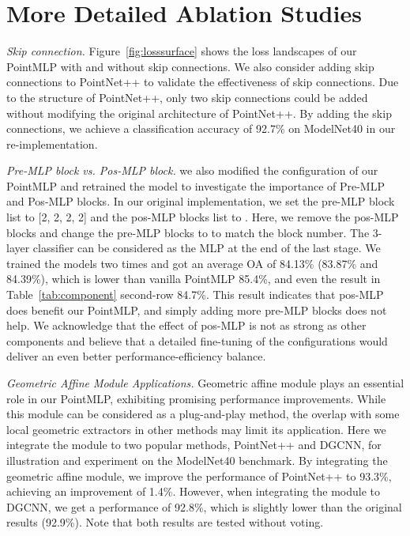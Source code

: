 \documentclass{article} \usepackage{iclr2022_conference,times}
\begin{document}
\section{More Detailed Ablation Studies}
\label{appendix:ablation}
\textit{Skip connection.} Figure~\ref{fig:losssurface} shows the loss landscapes of our PointMLP with and without skip connections. We also consider adding skip connections to PointNet++ to validate the effectiveness of skip connections. Due to the structure of PointNet++, only two skip connections could be added without modifying the original architecture of PointNet++. By adding the skip connections, we achieve a classification accuracy of 92.7\% on ModelNet40 in our re-implementation.


\textit{Pre-MLP block vs. Pos-MLP block.} 
we also modified the configuration of our PointMLP and retrained the model to investigate the importance of Pre-MLP and Pos-MLP blocks. In our original implementation, we set the pre-MLP block list to [2, 2, 2, 2] and the pos-MLP blocks list to . Here, we remove the pos-MLP blocks and change the pre-MLP blocks to  to match the block number. The 3-layer classifier can be considered as the MLP at the end of the last stage. We trained the models two times and got an average OA of 84.13\% (83.87\% and 84.39\%), which is lower than vanilla PointMLP 85.4\%, and even the result in Table~\ref{tab:component} second-row 84.7\%. This result indicates that pos-MLP does benefit our PointMLP, and simply adding more pre-MLP blocks does not help. We acknowledge that the effect of pos-MLP is not as strong as other components and believe that a detailed fine-tuning of the configurations would deliver an even better performance-efficiency balance.


\textit{Geometric Affine Module Applications.} Geometric affine module plays an essential role in our PointMLP, exhibiting promising performance improvements. While this module can be considered as a plug-and-play method, the overlap with some local geometric extractors in other methods may limit its application. Here we integrate the module to two popular methods, PointNet++ and DGCNN, for illustration and experiment on the ModelNet40 benchmark. By integrating the geometric affine module, we improve the performance of PointNet++ to 93.3\%,  achieving an improvement of 1.4\%. However, when integrating the module to DGCNN, we get a performance of 92.8\%, which is slightly lower than the original results (92.9\%). Note that both results are tested without voting. 
\end{document}
